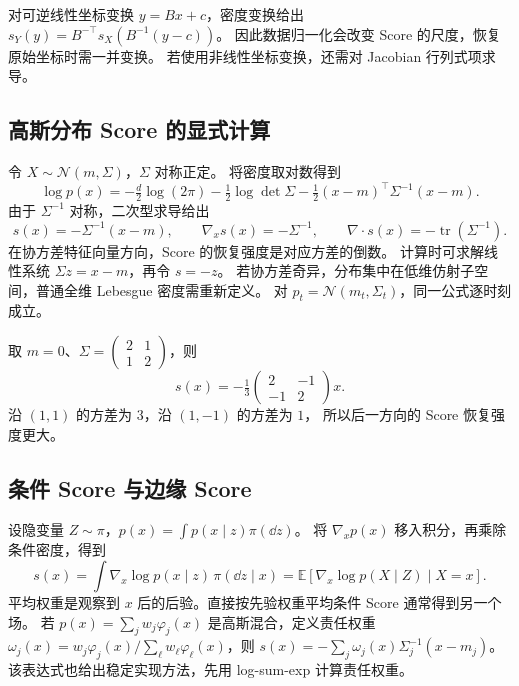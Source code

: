 对可逆线性坐标变换 \(y=Bx+c\)，密度变换给出
\(s_Y(y)=B^{-\top}s_X(B^{-1}(y-c))\)。
因此数据归一化会改变 Score 的尺度，恢复原始坐标时需一并变换。
若使用非线性坐标变换，还需对 Jacobian 行列式项求导。

\subsection{高斯分布 Score 的显式计算\requiredderivation}

令 \(X\sim\mathcal N(m,\Sigma)\)，\(\Sigma\) 对称正定。
将密度取对数得到
\[
 \log p(x)=-\tfrac d2\log(2\pi)-\tfrac12\log\det\Sigma
               -\tfrac12(x-m)^\top\Sigma^{-1}(x-m).
\]
由于 \(\Sigma^{-1}\) 对称，二次型求导给出
\begin{equation}
 s(x)=-\Sigma^{-1}(x-m),\qquad
 \nabla_xs(x)=-\Sigma^{-1},\qquad
 \nabla\cdot s(x)=-\operatorname{tr}(\Sigma^{-1}).
 \label{eq:fields-gaussian-score}
\end{equation}
在协方差特征向量方向，Score 的恢复强度是对应方差的倒数。
计算时可求解线性系统 \(\Sigma z=x-m\)，再令 \(s=-z\)。
若协方差奇异，分布集中在低维仿射子空间，普通全维 Lebesgue 密度需重新定义。
对 \(p_t=\mathcal N(m_t,\Sigma_t)\)，同一公式逐时刻成立。

\begin{example}[相关高斯]
取 \(m=0\)、\(\Sigma=\begin{pmatrix}2&1\\1&2\end{pmatrix}\)，则
\[
 s(x)=-\tfrac13\begin{pmatrix}2&-1\\-1&2\end{pmatrix}x.
\]
沿 \((1,1)\) 的方差为 \(3\)，沿 \((1,-1)\) 的方差为 \(1\)，
所以后一方向的 Score 恢复强度更大。
\end{example}

\subsection{条件 Score 与边缘 Score}

设隐变量 \(Z\sim\pi\)，\(p(x)=\int p(x\mid z)\pi(\dd z)\)。
将 \(\nabla_xp(x)\) 移入积分，再乘除条件密度，得到
\begin{equation}
 s(x)=\int\nabla_x\log p(x\mid z)\,\pi(\dd z\mid x)
     =\mathbb E[\nabla_x\log p(X\mid Z)\mid X=x].
 \label{eq:fields-fisher-identity}
\end{equation}
平均权重是观察到 \(x\) 后的后验。直接按先验权重平均条件 Score
通常得到另一个场。
若 \(p(x)=\sum_jw_j\varphi_j(x)\) 是高斯混合，定义责任权重
\(\omega_j(x)=w_j\varphi_j(x)/\sum_\ell w_\ell\varphi_\ell(x)\)，则
\(s(x)=-\sum_j\omega_j(x)\Sigma_j^{-1}(x-m_j)\)。
该表达式也给出稳定实现方法，先用 log-sum-exp 计算责任权重。

